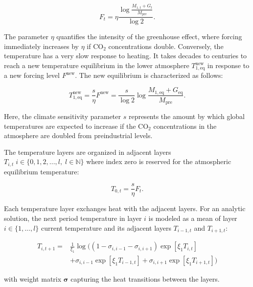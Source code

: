 \begin{equation}
    F_t = \eta \frac{
        \log \frac{M_{1,t} + G_t}{M_{\text{pre}}}
    }{\log 2} .
\end{equation}

The parameter \(\eta\) quantifies the intensity of the greenhouse effect, where forcing immediately increases by \(\eta\) if CO$_2$ concentrations double. Conversely, the temperature has a very slow response to heating. It takes decades to centuries to reach a new temperature equilibrium in the lower atmosphere \(T^{\text{new}}_{1,\text{eq}}\) in response to a new forcing level \(F^{\text{new}}\). The new equilibrium is characterized as follows:

\begin{equation}
    T^{\text{new}}_{1,\text{eq}} = \frac{s}{\eta} F^{\text{new}} = \frac{s}{\log 2} \log \frac{M_{1, \text{eq}}+G_{\text{eq}}}{M_{\text{pre}}} .
\end{equation}

Here, the climate sensitivity parameter \(s\) represents the amount by which global temperatures are expected to increase if the CO$_2$ concentrations in the atmosphere are doubled from preindustrial levels.

The temperature layers are organized in adjacent layers \(T_{i,t} \; i\in\{0, 1, 2,...,l, \;l\in \mathbb{N}\}\) where index zero is reserved for the atmospheric equilibrium temperature:

\begin{equation}
    T_{0, t} = \frac{s}{\eta} F_t .
\end{equation}

Each temperature layer exchanges heat with the adjacent layers. For an analytic solution, the next period temperature in layer \(i\) is modeled as a mean of layer \(i\in \{1,...,l\}\) current temperature and its adjacent layers \(T_{i-1, t}\) and \(T_{i+1, t}\):

\begin{equation}
\begin{aligned}
    T_{i, t+1} = &\frac{1}{\xi_1} \log \bigg(
        (1-\sigma_{i,i-1}-\sigma_{i,i+1}) \exp[\xi_1 T_{i,t}]\\
        &+ \sigma_{i,i-1}\exp[\xi_1 T_{i-1,t}] + \sigma_{i,i+1}\exp[\xi_1 T_{i+1,t}]
    \bigg )
\end{aligned}
\end{equation}

with  weight matrix \(\bm{\sigma}\) capturing the heat transitions between the layers. 